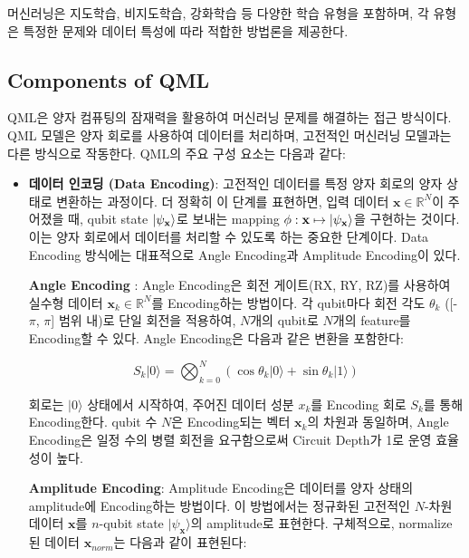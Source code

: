 머신러닝은 지도학습, 비지도학습, 강화학습 등 다양한 학습 유형을 포함하며, 각 유형은 특정한 문제와 데이터 특성에 따라 적합한 방법론을 제공한다.

\subsection{Components of QML}
QML은 양자 컴퓨팅의 잠재력을 활용하여 머신러닝 문제를 해결하는 접근 방식이다. QML 모델은 양자 회로를 사용하여 데이터를 처리하며, 고전적인 머신러닝 모델과는 다른 방식으로 작동한다. QML의 주요 구성 요소는 다음과 같다:

\begin{itemize} %
    \item \textbf{데이터 인코딩 (Data Encoding)}: 고전적인 데이터를 특정 양자 회로의 양자 상태로 변환하는 과정이다. 더 정확히 이 단계를 표현하면, 입력 데이터 $\mathbf{x} \in \mathbb{R}^N $이 주어졌을 때, qubit state \(\ket{\psi_{\mathbf{x}}}\)로 보내는 mapping ${\phi : \mathbf{x}  \mapsto \ket{ \psi_\mathbf{x}}}$을 구현하는 것이다. 이는 양자 회로에서 데이터를 처리할 수 있도록 하는 중요한 단계이다. Data Encoding 방식에는 대표적으로 Angle Encoding과 Amplitude Encoding이 있다.

    \subitem \textbf{Angle Encoding} : %
        Angle Encoding은 회전 게이트(RX, RY, RZ)를 사용하여 실수형 데이터 \( \mathbf{x}_k \in \mathbb{R}^N \)를 Encoding하는 방법이다. 각 qubit마다 회전 각도 \( \theta_k \) ([-\(\pi\), \(\pi\)] 범위 내)로 단일 회전을 적용하여, \( N \)개의 qubit로 \( N \)개의 feature를 Encoding할 수 있다. Angle Encoding은 다음과 같은 변환을 포함한다:

        \[
        S_k |0\rangle = \bigotimes_{k=0}^{N} \left( \cos{\theta_k} |0\rangle + \sin{\theta_k} |1\rangle \right)
        \]

        회로는 \( |0\rangle \) 상태에서 시작하여, 주어진 데이터 성분 \( x_k \)를 Encoding 회로 \( S_k \)를 통해 Encoding한다. qubit 수 \( N \)은 Encoding되는 벡터 \( \mathbf{x}_k \)의 차원과 동일하며, Angle Encoding은 일정 수의 병렬 회전을 요구함으로써 Circuit Depth가 1로 운영 효율성이 높다.

    \subitem \textbf{Amplitude Encoding}:
    Amplitude Encoding은 데이터를 양자 상태의 amplitude에 Encoding하는 방법이다. 이 방법에서는 정규화된 고전적인 \( N \)-차원 데이터 \( \mathbf{x} \)를 \( n \)-qubit state \( |\psi_{\mathbf{x}}\rangle \)의 amplitude로 표현한다. 구체적으로, normalize된 데이터 \( \mathbf{x}_{norm} \)는 다음과 같이 표현된다:


\end{itemize}
